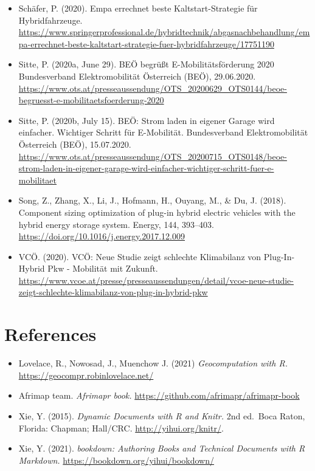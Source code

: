 \documentclass[
]{book}
\providecommand{\tightlist}{%
  \setlength{\itemsep}{0pt}\setlength{\parskip}{0pt}}
\begin{document}
\begin{itemize}
\item
  Schäfer, P. (2020). Empa errechnet beste Kaltstart-Strategie für Hybridfahrzeuge. \url{https://www.springerprofessional.de/hybridtechnik/abgasnachbehandlung/empa-errechnet-beste-kaltstart-strategie-fuer-hybridfahrzeuge/17751190}
\item
  Sitte, P. (2020a, June 29). BEÖ begrüßt E-Mobilitätsförderung 2020 \textbar{} Bundesverband Elektromobilität Österreich (BEÖ), 29.06.2020. \url{https://www.ots.at/presseaussendung/OTS_20200629_OTS0144/beoe-begruesst-e-mobilitaetsfoerderung-2020}
\item
  Sitte, P. (2020b, July 15). BEÖ: Strom laden in eigener Garage wird einfacher. Wichtiger Schritt für E-Mobilität. \textbar{} Bundesverband Elektromobilität Österreich (BEÖ), 15.07.2020. \url{https://www.ots.at/presseaussendung/OTS_20200715_OTS0148/beoe-strom-laden-in-eigener-garage-wird-einfacher-wichtiger-schritt-fuer-e-mobilitaet}
\item
  Song, Z., Zhang, X., Li, J., Hofmann, H., Ouyang, M., \& Du, J. (2018). Component sizing optimization of plug-in hybrid electric vehicles with the hybrid energy storage system. Energy, 144, 393--403. \url{https://doi.org/10.1016/j.energy.2017.12.009}
\item
  VCÖ. (2020). VCÖ: Neue Studie zeigt schlechte Klimabilanz von Plug-In-Hybrid Pkw - Mobilität mit Zukunft. \url{https://www.vcoe.at/presse/presseaussendungen/detail/vcoe-neue-studie-zeigt-schlechte-klimabilanz-von-plug-in-hybrid-pkw}
\end{itemize}

\hypertarget{reference}{%
\chapter{References}\label{reference}}

\begin{itemize}
\tightlist
\item
  Lovelace, R., Nowosad, J., Muenchow J. (2021) \emph{Geocomputation with R.} \url{https://geocompr.robinlovelace.net/}
\item
  Afrimap team. \emph{Afrimapr book.} \url{https://github.com/afrimapr/afrimapr-book}
\item
  Xie, Y. (2015). \emph{Dynamic Documents with R and Knitr.} 2nd ed.~Boca Raton, Florida: Chapman; Hall/CRC. \url{http://yihui.org/knitr/}.
\item
  Xie, Y. (2021). \emph{bookdown: Authoring Books and Technical Documents with R Markdown.} \url{https://bookdown.org/yihui/bookdown/}
\end{itemize}

  
\end{document}
